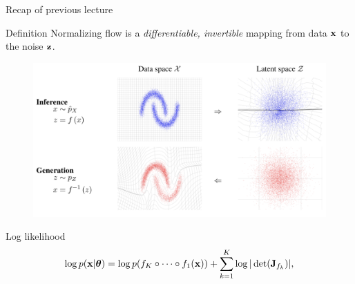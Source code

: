 

\begin{frame}
\titlepage
\end{frame}
\begin{frame}{Recap of previous lecture}
	\begin{block}{Definition}
		Normalizing flow is a \textit{differentiable, invertible} mapping from data $\mathbf{x}$ to the noise $\mathbf{z}$. 
	\end{block}
	\vspace{-0.1cm}
	\begin{figure}
		\includegraphics[width=0.85\linewidth]{figs/flows_how2}
	\end{figure}
	\vspace{-0.5cm}
	\begin{block}{Log likelihood}
		\vspace{-0.5cm}
		\[
			\log p(\mathbf{x} | \boldsymbol{\theta}) = \log p(f_K \circ \dots \circ f_1(\mathbf{x})) + \sum_{k=1}^K\log |\det (\mathbf{J}_{f_k})|,
		\]
	\end{block}
\end{frame}
